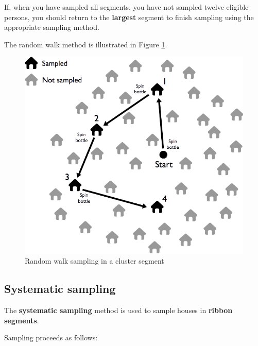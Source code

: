 \documentclass[12pt,a4paper]{book}
\theoremstyle{definition}
\theoremstyle{definition}
\theoremstyle{definition}
\theoremstyle{remark}
\begin{document}
If, when you have sampled all segments, you have not sampled twelve
eligible persons, you should return to the \textbf{largest} segment to
finish sampling using the appropriate sampling method.

The random walk method is illustrated in Figure \ref{fig:sample22}.

\begin{figure}[H]

{\centering \includegraphics{figures/stage2sample8} 

}

\caption{Random walk sampling in a cluster segment}\label{fig:sample22}
\end{figure}

\hypertarget{systematic-sampling}{%
\subsection{Systematic sampling}\label{systematic-sampling}}

The \textbf{systematic sampling} method is used to sample houses in
\textbf{ribbon segments}.

Sampling proceeds as follows:
\end{document}
